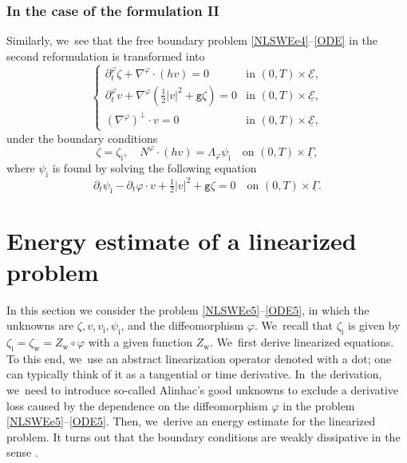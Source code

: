 \documentclass[JEP,XML,SOM,Unicode,NoFloatCountersInSection,published]{cedram}
\newcommand{\gr}{{\mathtt g}}
\newcommand{\dt}{\partial_t}
\newcommand{\cE}{{\mathcal E}}
\newcommand{\ul}[1]{\underline{#1}}
\newcommand{\itGamma}{\mathit{\Gamma}}
\theoremstyle{definition}
\begin{document}
\subsubsection{In the case of the formulation II}
Similarly, we~see that the free boundary problem \eqref{NLSWEe4}--\eqref{ODE} in the second reformulation is transformed into
\begin{equation}\label{NLSWEe5}
\begin{cases}
\dt^\varphi\zeta+\nabla^\varphi\cdot(hv) = 0 &\text{in } (0,T)\times\ul{\cE}, \\
\dt^\varphi v+\nabla^\varphi(\frac12|v|^2+\gr\zeta) = 0 &\text{in } (0,T)\times\ul{\cE}, \\
(\nabla^\varphi)^\perp\cdot v = 0 &\text{in } (0,T)\times\ul{\cE},
\end{cases}
\end{equation}
under the boundary conditions
\begin{equation}\label{BC5}
\zeta=\zeta_\mathrm{i}, \quad N^\varphi\cdot (h v) = \Lambda_\varphi \psi_\mathrm{i} \quad\text{on } (0,T)\times\ul{\itGamma},
\end{equation}
where $\psi_\mathrm{i}$ is found by solving the following equation
\begin{equation}\label{ODE5}
\dt \psi_\mathrm{i} -\dt \varphi\cdot v + \tfrac12|v|^2+\gr\zeta = 0 \quad\text{on } (0,T)\times\ul{\itGamma}.
\end{equation}

\section{Energy estimate of a linearized problem}\label{sect:EE}
In this section we consider the problem \eqref{NLSWEe5}--\eqref{ODE5}, in which the unknowns are $\zeta,v,v_\mathrm{i}, \psi_\mathrm{i}$, and the diffeomorphism $\varphi$. We~recall that $\zeta_\mathrm{i}$ is given by $\zeta_\mathrm{i}=\zeta_\mathrm{w}=Z_\mathrm{w}\circ\varphi$ with a given function $Z_\mathrm{w}$. We~first derive linearized equations.
To this end, we~use an abstract linearization operator denoted with a dot; one can typically think of it as a tangential or time derivative. In~the derivation, we~need to introduce so-called Alinhac's good unknowns to exclude a derivative loss caused by the dependence on the diffeomorphism $\varphi$
in the problem \eqref{NLSWEe5}--\eqref{ODE5}.
Then, we~derive an energy estimate for the linearized problem.
It turns out that the boundary conditions are weakly dissipative in the sense \cite{IguchiLannes2023}.
\end{document}
